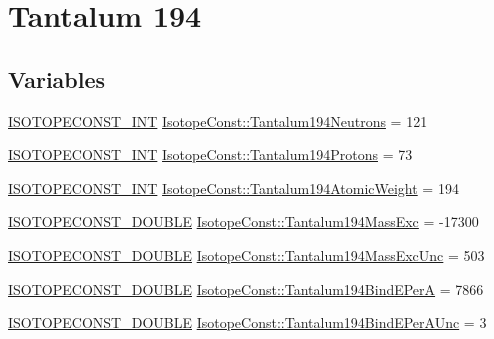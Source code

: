 \hypertarget{group___isotope_const-_tantalum-_ta194}{}\section{Tantalum 194}
\label{group___isotope_const-_tantalum-_ta194}
\subsection*{Variables}
\begin{DoxyCompactItemize}
\item 
\mbox{\hyperlink{group___isotope_const-_macros_ga5f18360b3e99483a35c32d789e62621c}{I\+S\+O\+T\+O\+P\+E\+C\+O\+N\+S\+T\+\_\+\+I\+NT}} \mbox{\hyperlink{group___isotope_const-_tantalum-_ta194_ga4dc03b29e26ded9c09acca6b168dbf55}{Isotope\+Const\+::\+Tantalum194\+Neutrons}} = 121
\item 
\mbox{\hyperlink{group___isotope_const-_macros_ga5f18360b3e99483a35c32d789e62621c}{I\+S\+O\+T\+O\+P\+E\+C\+O\+N\+S\+T\+\_\+\+I\+NT}} \mbox{\hyperlink{group___isotope_const-_tantalum-_ta194_gab030eafaeebf3451533893554324ddbe}{Isotope\+Const\+::\+Tantalum194\+Protons}} = 73
\item 
\mbox{\hyperlink{group___isotope_const-_macros_ga5f18360b3e99483a35c32d789e62621c}{I\+S\+O\+T\+O\+P\+E\+C\+O\+N\+S\+T\+\_\+\+I\+NT}} \mbox{\hyperlink{group___isotope_const-_tantalum-_ta194_gafcb87f06984c4edbca018040857af9f0}{Isotope\+Const\+::\+Tantalum194\+Atomic\+Weight}} = 194
\item 
\mbox{\hyperlink{group___isotope_const-_macros_ga8f45a7272ce02c0b4c65c44636ed719a}{I\+S\+O\+T\+O\+P\+E\+C\+O\+N\+S\+T\+\_\+\+D\+O\+U\+B\+LE}} \mbox{\hyperlink{group___isotope_const-_tantalum-_ta194_gafa79365c6f5a6795fc01e7e09419c337}{Isotope\+Const\+::\+Tantalum194\+Mass\+Exc}} = -\/17300
\item 
\mbox{\hyperlink{group___isotope_const-_macros_ga8f45a7272ce02c0b4c65c44636ed719a}{I\+S\+O\+T\+O\+P\+E\+C\+O\+N\+S\+T\+\_\+\+D\+O\+U\+B\+LE}} \mbox{\hyperlink{group___isotope_const-_tantalum-_ta194_ga5fb1e24a626123b7a590fd5c084e925a}{Isotope\+Const\+::\+Tantalum194\+Mass\+Exc\+Unc}} = 503
\item 
\mbox{\hyperlink{group___isotope_const-_macros_ga8f45a7272ce02c0b4c65c44636ed719a}{I\+S\+O\+T\+O\+P\+E\+C\+O\+N\+S\+T\+\_\+\+D\+O\+U\+B\+LE}} \mbox{\hyperlink{group___isotope_const-_tantalum-_ta194_ga7f59beae33dc511e3208155c4327b9fc}{Isotope\+Const\+::\+Tantalum194\+Bind\+E\+PerA}} = 7866
\item 
\mbox{\hyperlink{group___isotope_const-_macros_ga8f45a7272ce02c0b4c65c44636ed719a}{I\+S\+O\+T\+O\+P\+E\+C\+O\+N\+S\+T\+\_\+\+D\+O\+U\+B\+LE}} \mbox{\hyperlink{group___isotope_const-_tantalum-_ta194_gad6e359a1dbddd715dc9214fb419f9d85}{Isotope\+Const\+::\+Tantalum194\+Bind\+E\+Per\+A\+Unc}} = 3

\end{DoxyCompactItemize}
